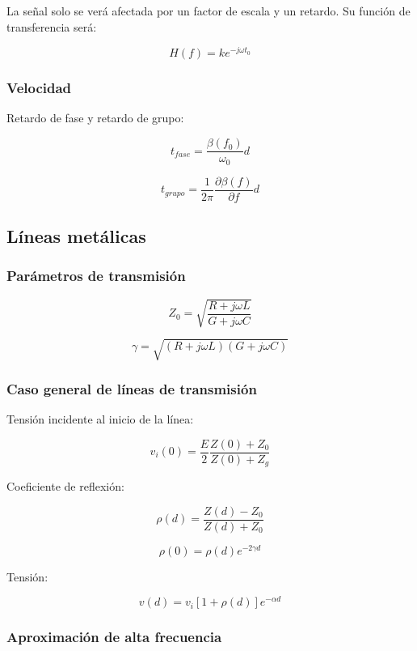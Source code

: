 \documentclass[12pt,a4paper]{article}
\begin{document}
La señal solo se verá afectada por un factor de escala y un retardo. Su función
de transferencia será:

\[ H(f) = k e^{-j \omega t_0} \]

\subsubsection{Velocidad}
\label{ssub:velocidad}

Retardo de fase y retardo de grupo:

\[ t_{fase} = \frac{\beta(f_0)}{\omega_0} d \]

\[ t_{grupo} = \frac{1}{2\pi} \frac{\partial \beta(f)}{\partial f} d \]

\subsection{Líneas metálicas}
\label{sub:lineas_metalicas}

\subsubsection{Parámetros de transmisión}
\label{ssub:parametros_de_transmision}

\[ Z_0 = \sqrt{\frac{R + j \omega L}{G + j \omega C}} \]

\[ \gamma = \sqrt{(R + j \omega L)(G + j \omega C)} \]

\subsubsection{Caso general de líneas de transmisión}
\label{ssub:caso_general_de_lineas_de_transmision}

Tensión incidente al inicio de la línea:

\[ v_i (0) = \frac{E}{2} \frac{Z(0) + Z_0}{Z(0) + Z_g} \]

Coeficiente de reflexión:

\[ \rho (d) = \frac{Z(d) - Z_0}{Z(d) + Z_0} \]

\[ \rho(0) = \rho(d) e^{-2 \gamma d} \]

Tensión:

\[ v(d) = v_i [1 + \rho (d) ] e^{- \alpha d} \]

\subsubsection{Aproximación de alta frecuencia}
\label{ssub:aproximacion_de_alta_frecuencia}
\end{document}
